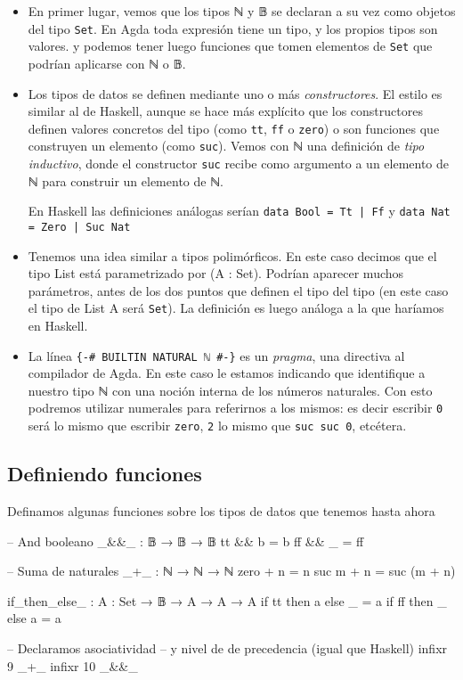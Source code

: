 \documentclass[11pt]{article} %
\begin{document}
\begin{itemize}
    \item En primer lugar, vemos que los tipos ℕ y 𝔹 se declaran a su vez como objetos del tipo \texttt{Set}. En Agda toda expresión tiene un tipo, y los propios tipos son valores. y podemos tener luego funciones que tomen elementos de \texttt{Set} que podrían aplicarse con ℕ o 𝔹.
    
    \item Los tipos de datos se definen mediante uno o más \textit{constructores}. El estilo es similar al de Haskell, aunque se hace más explícito que los constructores definen valores concretos del tipo (como \texttt{tt}, \texttt{ff} o \texttt{zero}) o son funciones que construyen un elemento (como \texttt{suc}). Vemos con ℕ una definición de \textit{tipo inductivo}, donde el constructor \texttt{suc} recibe como argumento a un elemento de ℕ para construir un elemento de ℕ. 
    
    En Haskell las definiciones análogas serían \texttt{data Bool = Tt | Ff} y \texttt{data Nat = Zero | Suc Nat }

    \item Tenemos una idea similar a tipos polimórficos. En este caso decimos que el tipo List está parametrizado por (A : Set). Podrían aparecer muchos parámetros, antes de los dos puntos que definen el tipo del tipo (en este caso el tipo de List A será \verb|Set|). La definición es luego análoga a la que haríamos en Haskell.
    
    \item La línea \texttt{\{-\# BUILTIN NATURAL ℕ \#-\}} es un \textit{pragma}, una directiva al compilador de Agda. En este caso le estamos indicando que identifique a nuestro tipo ℕ con una noción interna de los números naturales. Con esto podremos utilizar numerales para referirnos a los mismos: es decir escribir \texttt{0} será lo mismo que escribir \texttt{zero}, \texttt{2} lo mismo que \texttt{suc suc 0}, etcétera.
\end{itemize}

\subsection{Definiendo funciones}
Definamos algunas funciones sobre los tipos de datos que tenemos hasta ahora 
\begin{code}
-- And booleano
_&&_ : 𝔹 → 𝔹 → 𝔹
tt && b = b
ff && _ = ff

-- Suma de naturales
_+_ : ℕ → ℕ → ℕ
zero + n = n
suc m + n = suc (m + n)

if_then_else_ : {A : Set} → 𝔹 → A → A → A
if tt then a else _ = a
if ff then _ else a = a

-- Declaramos asociatividad
-- y nivel de de precedencia (igual que Haskell)
infixr 9 _+_  
infixr 10 _&&_
\end{code}
\end{document}
